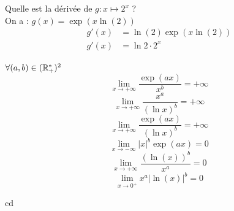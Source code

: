 \begin{exemple}
	Quelle est la dérivée de $g : x \mapsto 2^x$ ? \\
	On a : $g(x) = \exp{(x \ln{(2)})}$
	\begin{align*}
		g'(x) &= \ln{(2)} \exp{(x\ln{(2)})} \\
		g'(x) &= \ln{2} \cdot 2^x
	\end{align*}
\end{exemple}

\begin{graybox}
	\begin{theoreme}
		$\forall (a, b) \in (\mathbb{R}^*_+)^2$
		\[\lim_{x \to +\infty} \frac{\exp{(ax)}}{x^b} = + \infty \]
		\[\lim_{x \to +\infty} \frac{x^a}{(\ln{x})^b} = +\infty\] 
		\[\lim_{x \to +\infty} \frac{\exp{(ax)}}{(\ln{x})^b} = +\infty\]
		\[ \lim_{x \to -\infty} |x|^b \exp{(ax)} = 0 \]
		\[ \lim_{x \to +\infty} \frac{(\ln{(x)})^b}{x^a} = 0 \]
		\[ \lim_{x \to 0^{+}} x^a |\ln{(x)}|^b = 0 \]
	\end{theoreme}
\end{graybox}
cd 